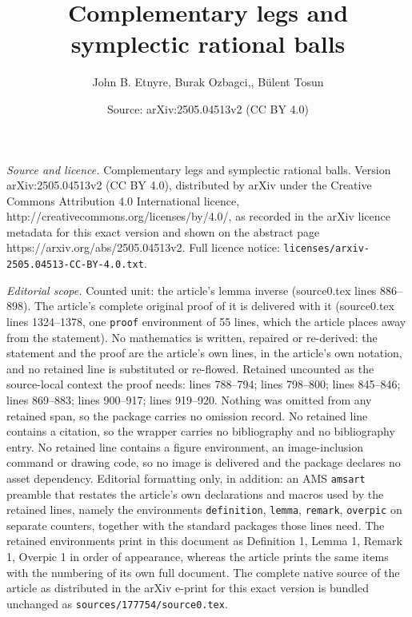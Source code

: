 \documentclass[10pt,a4paper]{amsart}
\title{Complementary legs and symplectic rational balls}
\author{John B. Etnyre, Burak Ozbagci,, B\"ulent Tosun}
\date{Source: arXiv:2505.04513v2 (CC BY 4.0)}
\begin{document}
\maketitle

\noindent\emph{Source and licence.} Complementary legs and symplectic rational balls. Version arXiv:2505.04513v2 (CC BY 4.0), distributed by arXiv under the Creative Commons Attribution 4.0 International licence, http://creativecommons.org/licenses/by/4.0/, as recorded in the arXiv licence metadata for this exact version and shown on the abstract page https://arxiv.org/abs/2505.04513v2. Full licence notice: \texttt{licenses/arxiv-2505.04513-CC-BY-4.0.txt}.\par\smallskip

\noindent\textit{Editorial scope.} Counted unit: the article's lemma inverse (source0.tex lines 886--898). The article's complete original proof of it is delivered with it (source0.tex lines 1324--1378, one \texttt{proof} environment of 55 lines, which the article places away from the statement). No mathematics is written, repaired or re-derived: the statement and the proof are the article's own lines, in the article's own notation, and no retained line is substituted or re-flowed.  Retained uncounted as the source-local context the proof needs: lines 788--794; lines 798--800; lines 845--846; lines 869--883; lines 900--917; lines 919--920.  Nothing was omitted from any retained span, so the package carries no omission record.  No retained line contains a citation, so the wrapper carries no bibliography and no bibliography entry.  No retained line contains a figure environment, an image-inclusion command or drawing code, so no image is delivered and the package declares no asset dependency.  Editorial formatting only, in addition: an AMS \texttt{amsart} preamble that restates the article's own declarations and macros used by the retained lines, namely the environments \texttt{definition}, \texttt{lemma}, \texttt{remark}, \texttt{overpic} on separate counters, together with the standard packages those lines need.  The retained environments print in this document as Definition 1, Lemma 1, Remark 1, Overpic 1 in order of appearance, whereas the article prints the same items with the numbering of its own full document.  The complete native source of the article as distributed in the arXiv e-print for this exact version is bundled unchanged as \texttt{sources/177754/source0.tex}.
\end{document}
